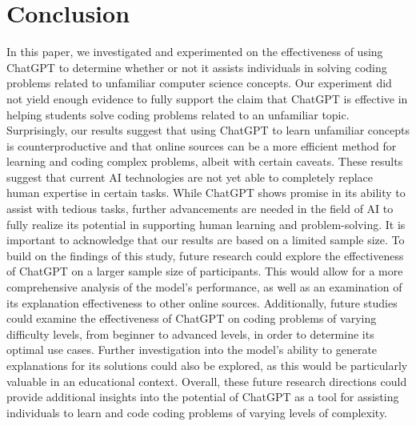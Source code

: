 \documentclass[manuscript,screen,nonacm]{acmart}
\begin{document}
\section{Conclusion} 
In this paper, we investigated and experimented on the effectiveness of using ChatGPT to determine whether or not it assists individuals in solving coding problems related to unfamiliar computer science concepts. Our experiment did not yield enough evidence to fully support the claim that ChatGPT is effective in helping students solve coding problems related to an unfamiliar topic. Surprisingly, our results suggest that using ChatGPT to learn unfamiliar concepts is counterproductive and that online sources can be a more efficient method for learning and coding complex problems, albeit with certain caveats. These results suggest that current AI technologies are not yet able to completely replace human expertise in certain tasks. While ChatGPT shows promise in its ability to assist with tedious tasks\cite{noy2023experimental}, further advancements are needed in the field of AI to fully realize its potential in supporting human learning and problem-solving. It is important to acknowledge that our results are based on a limited sample size. To build on the findings of this study, future research could explore the effectiveness of ChatGPT on a larger sample size of participants. This would allow for a more comprehensive analysis of the model's performance, as well as an examination of its explanation effectiveness to other online sources. Additionally, future studies could examine the effectiveness of ChatGPT on coding problems of varying difficulty levels, from beginner to advanced levels, in order to determine its optimal use cases. Further investigation into the model's ability to generate explanations for its solutions could also be explored, as this would be particularly valuable in an educational context. Overall, these future research directions could provide additional insights into the potential of ChatGPT as a tool for assisting individuals to learn and code coding problems of varying levels of complexity.







\end{document}
